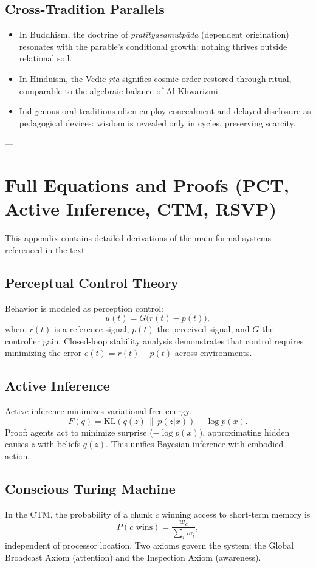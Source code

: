 \section*{Cross-Tradition Parallels}
\begin{itemize}
  \item In Buddhism, the doctrine of \emph{pratītyasamutpāda} (dependent origination) resonates with the parable’s conditional growth: nothing thrives outside relational soil.  
  \item In Hinduism, the Vedic \emph{ṛta} signifies cosmic order restored through ritual, comparable to the algebraic balance of Al-Khwarizmi.  
  \item Indigenous oral traditions often employ concealment and delayed disclosure as pedagogical devices: wisdom is revealed only in cycles, preserving scarcity.  
\end{itemize}

---

\chapter{Full Equations and Proofs (PCT, Active Inference, CTM, RSVP)}
This appendix contains detailed derivations of the main formal systems referenced in the text.

\section*{Perceptual Control Theory}
Behavior is modeled as perception control:
\[
u(t) = G \big( r(t) - p(t) \big),
\]
where $r(t)$ is a reference signal, $p(t)$ the perceived signal, and $G$ the controller gain.  
Closed-loop stability analysis demonstrates that control requires minimizing the error $e(t) = r(t) - p(t)$ across environments.  

\section*{Active Inference}
Active inference minimizes variational free energy:
\[
F(q) = \mathrm{KL}(q(z)\,\|\,p(z|x)) - \log p(x).
\]
Proof: agents act to minimize surprise ($-\log p(x)$), approximating hidden causes $z$ with beliefs $q(z)$.  
This unifies Bayesian inference with embodied action.  

\section*{Conscious Turing Machine}
In the CTM, the probability of a chunk $c$ winning access to short-term memory is
\[
P(c \text{ wins}) = \frac{w_c}{\sum_i w_i},
\]
independent of processor location.  
Two axioms govern the system: the Global Broadcast Axiom (attention) and the Inspection Axiom (awareness).  

